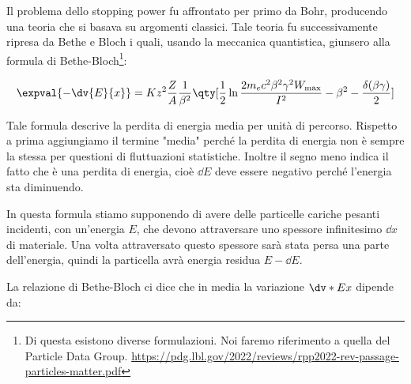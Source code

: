 Il problema dello stopping power fu affrontato per primo da Bohr, producendo una teoria che si basava su argomenti classici. Tale teoria fu successivamente ripresa da Bethe e Bloch i quali, usando la meccanica quantistica, giunsero alla formula di Bethe-Bloch\footnote{Di questa esistono diverse formulazioni. Noi faremo riferimento a quella del Particle Data Group. \url{https://pdg.lbl.gov/2022/reviews/rpp2022-rev-passage-particles-matter.pdf}}:

\begin{equation*}
    \expval{-\dv{E}{x}}
    =Kz^2\frac{Z}{A} \frac{1}{\beta^2} \qty[ \frac{1}{2}\ln{\frac{2m_e c^2 \beta^2 \gamma^2 W_{\rm max}}{I^2}} - \beta^2 - \frac{\delta(\beta \gamma)}{2} ]
\end{equation*}

Tale formula descrive la perdita di energia media per unità di percorso. Rispetto a prima aggiungiamo il termine "media" perché la perdita di energia non è sempre la stessa per questioni di fluttuazioni statistiche. Inoltre il segno meno indica il fatto che è una perdita di energia, cioè $\dd{E}$ deve essere negativo perché l'energia sta diminuendo.

\begin{minipage}{0.295\textwidth}
    \begin{figure}[H]
        \centering
    \end{figure}
\end{minipage}
\begin{minipage}{0.7\textwidth}
    \vspace{0.35cm}In questa formula stiamo supponendo di avere delle particelle cariche pesanti incidenti, con un'energia $E$, che devono attraversare uno spessore infinitesimo $\dd{x}$ di materiale. Una volta attraversato questo spessore sarà stata persa una parte dell'energia, quindi la particella avrà energia residua $E - \dd{E}$.
\end{minipage}

\vspace{0.3cm}La relazione di Bethe-Bloch ci dice che in media la variazione $\dv*{E}{x}$ dipende da:


